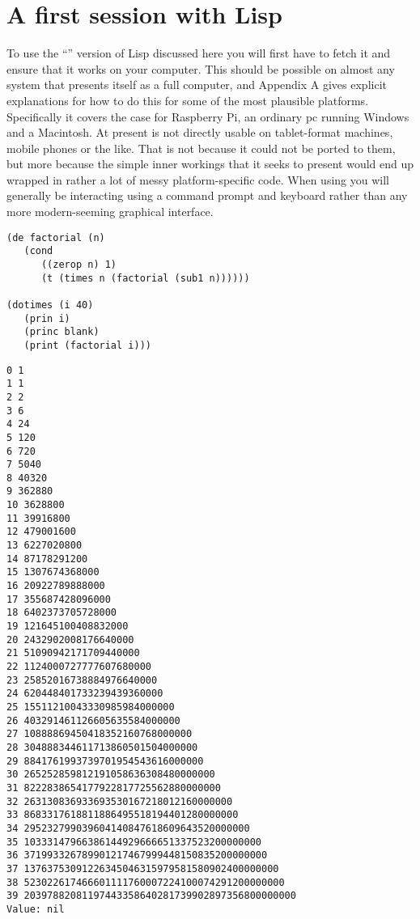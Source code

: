 \chapter{A first session with Lisp}
To use the ``\vsl'' version of Lisp discussed here you will first have to
fetch it and ensure that it works on your computer. This should be
possible on almost any system that presents itself as a full computer,
and Appendix A gives explicit explanations for how to do this for
some of the most plausible platforms. Specifically it covers the case for
Raspberry Pi, an ordinary pc running Windows and a Macintosh. At present \vsl{}
is not directly usable on tablet-format machines, mobile phones or the like.
That is not because it could not be ported to them, but more because
the simple inner workings that it seeks to present would end up wrapped
in rather a lot of messy platform-specific code. When using \vsl{}
you will generally be interacting using a command prompt and keyboard
rather than any more modern-seeming graphical interface.


{\small\begin{verbatim}
(de factorial (n)
   (cond
      ((zerop n) 1)
      (t (times n (factorial (sub1 n))))))

(dotimes (i 40)
   (prin i)
   (princ blank)
   (print (factorial i)))
\end{verbatim}}

{\small\begin{verbatim}
0 1
1 1
2 2
3 6
4 24
5 120
6 720
7 5040
8 40320
9 362880
10 3628800
11 39916800
12 479001600
13 6227020800
14 87178291200
15 1307674368000
16 20922789888000
17 355687428096000
18 6402373705728000
19 121645100408832000
20 2432902008176640000
21 51090942171709440000
22 1124000727777607680000
23 25852016738884976640000
24 620448401733239439360000
25 15511210043330985984000000
26 403291461126605635584000000
27 10888869450418352160768000000
28 304888344611713860501504000000
29 8841761993739701954543616000000
30 265252859812191058636308480000000
31 8222838654177922817725562880000000
32 263130836933693530167218012160000000
33 8683317618811886495518194401280000000
34 295232799039604140847618609643520000000
35 10333147966386144929666651337523200000000
36 371993326789901217467999448150835200000000
37 13763753091226345046315979581580902400000000
38 523022617466601111760007224100074291200000000
39 20397882081197443358640281739902897356800000000
Value: nil
\end{verbatim}}




